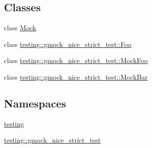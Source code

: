 \subsection*{Classes}
\begin{DoxyCompactItemize}
\item 
class \hyperlink{classMock}{Mock}
\item 
class \hyperlink{classtesting_1_1gmock__nice__strict__test_1_1Foo}{testing\+::gmock\+\_\+nice\+\_\+strict\+\_\+test\+::\+Foo}
\item 
class \hyperlink{classtesting_1_1gmock__nice__strict__test_1_1MockFoo}{testing\+::gmock\+\_\+nice\+\_\+strict\+\_\+test\+::\+Mock\+Foo}
\item 
class \hyperlink{classtesting_1_1gmock__nice__strict__test_1_1MockBar}{testing\+::gmock\+\_\+nice\+\_\+strict\+\_\+test\+::\+Mock\+Bar}
\end{DoxyCompactItemize}
\subsection*{Namespaces}
\begin{DoxyCompactItemize}
\item 
 \hyperlink{namespacetesting}{testing}
\item 
 \hyperlink{namespacetesting_1_1gmock__nice__strict__test}{testing\+::gmock\+\_\+nice\+\_\+strict\+\_\+test}
\end{DoxyCompactItemize}
